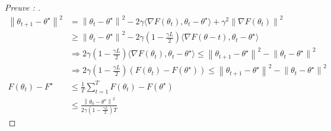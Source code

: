 \begin{proof}[Preuve : ]
    \begin{align*}
        \left\| \theta _{t+1} - \theta ^\star  \right\| ^2 
            &= \left\| \theta _t - \theta ^\star  \right\| ^2 - 2 \gamma  \langle \nabla F(\theta _t), \theta _t - \theta ^\star \rangle + \gamma  ^2 \left\| \nabla F(\theta _t) \right\| ^2 \\
            &\geq  \left\| \theta _t - \theta ^\star  \right\| ^2 - 2 \gamma ( 1 - \frac{\gamma L }{2}) \langle \nabla F(\theta -t) , \theta _t - \theta ^\star \rangle  \\
            &\Rightarrow 2 \gamma (1 - \frac{\gamma L}{2}) \langle \nabla F(\theta _t) , \theta _t - \theta ^\star \rangle \leq  \left\| \theta _{t+1} - \theta ^\star  \right\| ^2 - \left\| \theta _t - \theta ^\star  \right\| ^2  \\
            &\Rightarrow 2 \gamma (1 - \frac{\gamma L }{2}) (F(\theta _t) - F(\theta ^\star )) \leq  \left\| \theta _{t+1} - \theta ^\star  \right\| ^2 - \left\| \theta _t - \theta ^\star  \right\| ^2  \\
        F(\theta _t) - F^\star 
            &\leq \frac{1}{T}\sum_{t=1}^{T} F(\theta _t) - F(\theta ^\star ) \\
            &\leq \frac{\left\| \theta _0 - \theta ^\star  \right\| ^2}{ 2 \gamma (1 - \frac{\gamma L}{2}) T}
    \end{align*}
    
\end{proof}
